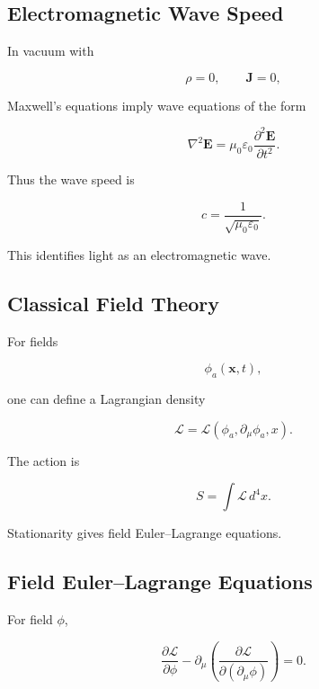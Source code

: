 \subsection{Electromagnetic Wave Speed}
\label{subsec:electromagnetic-wave-speed}

In vacuum with

\[
\rho=0,
\qquad
\mathbf{J}=0,
\]

Maxwell's equations imply wave equations of the form

\[
\boxed{
\nabla^2\mathbf{E}
=
\mu_0\varepsilon_0
\frac{\partial^2\mathbf{E}}{\partial t^2}.
}
\]

Thus the wave speed is

\[
\boxed{
c
=
\frac{1}
{\sqrt{\mu_0\varepsilon_0}}.
}
\]

This identifies light as an electromagnetic wave.

\subsection{Classical Field Theory}
\label{subsec:classical-field-theory}

For fields

\[
\phi_a(\mathbf{x},t),
\]

one can define a Lagrangian density

\[
\boxed{
\mathcal{L}
=
\mathcal{L}
\left(
\phi_a,
\partial_\mu\phi_a,
x
\right).
}
\]

The action is

\[
\boxed{
S
=
\int
\mathcal{L}\,d^4x.
}
\]

Stationarity gives field Euler--Lagrange equations.

\subsection{Field Euler--Lagrange Equations}
\label{subsec:field-euler-lagrange}

For field \(\phi\),

\[
\boxed{
\frac{\partial\mathcal{L}}{\partial\phi}
-
\partial_\mu
\left(
\frac{\partial\mathcal{L}}
{\partial(\partial_\mu\phi)}
\right)
=
0.
}
\]

